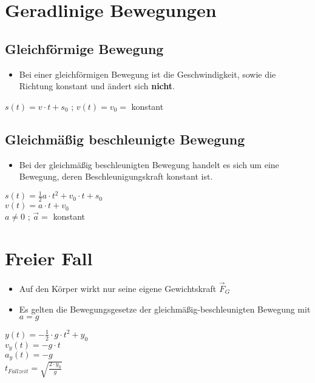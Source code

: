 \documentclass{article}
\begin{document}
\section*{Geradlinige Bewegungen}
\subsection*{Gleichförmige Bewegung}
\begin{itemize}
	\item Bei einer gleichförmigen Bewegung ist die Geschwindigkeit, sowie die Richtung konstant und ändert sich \textbf{nicht}.
\end{itemize}
\begin{center}
	$s(t) = v \cdot t + s_0$ ; $v(t) = v_0 =$ konstant
\end{center}
\subsection*{Gleichmäßig beschleunigte Bewegung}
\begin{itemize}
	\item Bei der gleichmäßig beschleunigten Bewegung handelt es sich um eine Bewegung, deren Beschleunigungskraft konstant ist.
\end{itemize}
\begin{center}
	$s(t) = \frac{1}{2}a \cdot t^2 + v_0 \cdot t + s_0$\\
	$v(t) = a \cdot t + v_0$\\
	$a \neq 0$ ; $\vec{a} =$ konstant
\end{center}
\section*{Freier Fall}
\begin{itemize}
	\item Auf den Körper wirkt nur seine eigene Gewichtskraft $\vec{F}_G$
	\item Es gelten die Bewegungsgesetze der gleichmäßig-beschleunigten Bewegung mit $a=g$
\end{itemize}
\begin{center}
	$y(t) = -\frac{1}{2} \cdot g \cdot t^2 + y_0$\\
	$v_y(t) = -g \cdot t$\\
	$a_y(t) = -g$\\
	$t_{Fallzeit} = \sqrt{\frac{2 \cdot y_0}{g}}$
\end{center}
\end{document}
